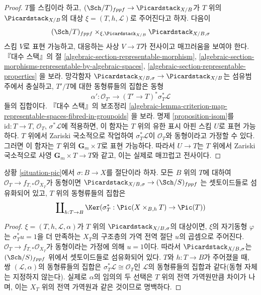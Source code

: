 \begin{proof}
$T$를 스킴이라 하고, $(\Sch/T)_{fppf} \to \Picardstack_{X/B}$가
$T$ 위의 $\Picardstack_{X/B}$의 대상
$\xi = (T, h, \mathcal{L})$로 주어진다고 하자. 다음이
$$
(\Sch/T)_{fppf} \times_{\xi, \Picardstack_{X/B}} \Picardstack_{X/B, \sigma}
$$
스킴 $V$로 표현 가능하고, 대응하는 사상 $V \to T$가 전사이고
매끄러움을 보여야 한다. 『대수 스택』의 절
\ref{algebraic-section-representable-morphism},
\ref{algebraic-section-morphisms-representable-by-algebraic-spaces},
\ref{algebraic-section-representable-properties}
을 보라. 망각함자
$\Picardstack_{X/B, \sigma} \to \Picardstack_{X/B}$는 섬유범주에서
충실하고, $T'/T$에 대한 동형류들의 집합은 동형
$$
\alpha' : \mathcal{O}_{T'} \longrightarrow (T' \to T)^*\sigma_T^*\mathcal{L}
$$
들의 집합이다. 『대수 스택』의 보조정리
\ref{algebraic-lemma-criterion-map-representable-spaces-fibred-in-groupoids}
을 보라. 명제 \ref{proposition-isom}를
$\text{id} : T \to T$, $\mathcal{O}_T$, $\sigma^*\mathcal{L}$에 적용하면,
이 함자는 $T$ 위의 유한 표시 아핀 스킴 $U$로 표현 가능하다.
$T$ 위에서 Zariski 국소적으로 작업하여
$\sigma_T^*\mathcal{L}$이 $\mathcal{O}_T$와 동형이라고 가정할 수 있다.
그러면 이 함자는 $T$ 위의 $\mathbf{G}_m \times T$로 표현 가능하다.
따라서 $U \to T$는 $T$ 위에서 Zariski 국소적으로 사영
$\mathbf{G}_m \times T \to T$와 같고, 이는 실제로 매끄럽고 전사이다.
\end{proof}

\begin{lemma}
\label{lemma-flat-geometrically-connected-fibres-with-section-functor-stack}
상황 \ref{situation-pic}에서 $\sigma : B \to X$를 절단이라 하자.
모든 $B$ 위의 $T$에 대하여
$\mathcal{O}_T \to f_{T, *}\mathcal{O}_{X_T}$가 동형이면
$\Picardstack_{X/B, \sigma} \to (\Sch/S)_{fppf}$
는 셋토이드들로 섬유화되어 있고, $T$ 위의 동형류들의 집합은
$$
\coprod\nolimits_{h : T \to B}
\Ker(\sigma_T^* : \Pic(X \times_{B, h} T) \to \Pic(T))
$$
\end{lemma}

\begin{proof}
$\xi = (T, h, \mathcal{L}, \alpha)$가 $T$ 위의
$\Picardstack_{X/B, \sigma}$의 대상이면, $\xi$의 자기동형 $\varphi$는
$\sigma_T^*u = 1$을 더 만족하는 $X_T$의 구조층의 가역 전역 절단
$u$의 곱셈으로 주어진다. $\mathcal{O}_T \to f_{T, *}\mathcal{O}_{X_T}$가
동형이라는 가정에 의해 $u = 1$이다. 따라서
$\Picardstack_{X/B, \sigma}$는 $(\Sch/S)_{fppf}$ 위에서 셋토이드들로
섬유화되어 있다. $T$와 $h : T \to B$가 주어졌을 때, 쌍
$(\mathcal{L}, \alpha)$의 동형류들의 집합은
$\sigma_T^*\mathcal{L} \cong \mathcal{O}_T$인 $\mathcal{L}$의 동형류들의
집합과 같다(동형 자체는 지정하지 않는다). 실제로 $\alpha$의 임의의 두
선택은 $T$ 위의 전역 가역원만큼 차이가 나며, 이는 $X_T$ 위의
전역 가역원과 같은 것이므로 명백하다.
\end{proof}

